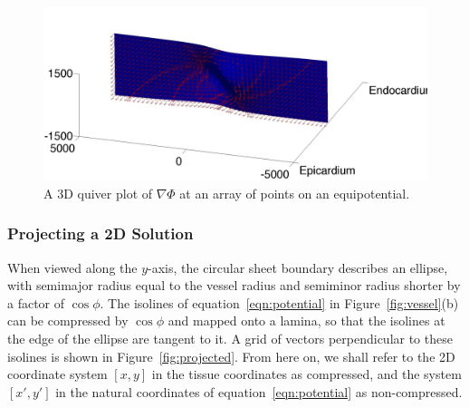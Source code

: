     \begin{figure}[htbp]
      \centering
      \includegraphics[width=1\textwidth]{Ch4/Figs/del_phi}
      \caption{A 3D quiver plot of $\nabla\Phi$ at an array of points on an equipotential.}
      \label{fig:del_phi}
    \end{figure}
  
  \subsubsection{Projecting a 2D Solution} %
  \label{sub:projecting_a_2_d_solution}
    When viewed along the $y$-axis, the circular sheet boundary describes an ellipse, with semimajor radius equal to the vessel radius and semiminor radius shorter by a factor of $\cos \phi$. The isolines of equation~\ref{eqn:potential} in Figure~\ref{fig:vessel}(b) can be compressed by $\cos \phi$ and mapped onto a lamina, so that the isolines at the edge of the ellipse are tangent to it. A grid of vectors perpendicular to these isolines is shown in Figure~\ref{fig:projected}. From here on, we shall refer to the 2D coordinate system $\left[ x, y \right]$ in the tissue coordinates as compressed, and the system $\left[ x', y' \right]$ in the natural coordinates of equation~\ref{eqn:potential} as non-compressed.
    
